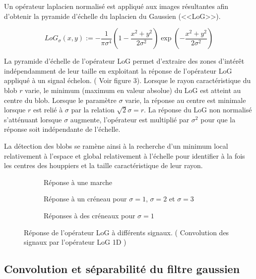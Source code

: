 \documentclass{article}
\begin{document}
	Un opérateur laplacien normalisé est appliqué aux images résultantes afin d'obtenir la pyramide d'échelle du laplacien du Gaussien (<<LoG>>). 

	\[{LoG}_{\sigma}(x,y):=-\frac{1}{\pi\sigma^{4}}(1-\frac{x^{2}+y^{2}}{2\sigma^{2}})\exp(-\frac{x^{2}+y^{2}}{2\sigma^{2}})\] 

	La pyramide d'échelle de l'opérateur LoG permet d'extraire des zones d'intérêt indépendamment de leur taille en exploitant la réponse de l'opérateur LoG appliqué à un signal échelon. ( Voir figure 3). Lorsque le rayon caractéristique du blob $r$ varie, le minimum (maximum en valeur absolue) du LoG est atteint au centre du blob. Lorsque le paramètre $\sigma$ varie, la réponse au centre est minimale lorsque $r$ est relié à $\sigma$ par la relation $\sqrt{2}\sigma=r$. La réponse du LoG non normalisé s'atténuant lorsque $\sigma$ augmente, l'opérateur est multiplié par $\sigma^{2}$ pour que la réponse soit indépendante de l'échelle.

	La détection des blobs se ramène ainsi à la recherche d'un minimum local relativement à l'espace et global relativement à l'échelle pour identifier à la fois les centres des houppiers et la taille caractéristique de leur rayon. 

	
\begin{figure}[h]
	\begin{subfigure}{.5\textwidth}
		\scalebox{0.3}{}
		\caption{Réponse à une marche}
	\end{subfigure}
	\begin{subfigure}{.5\textwidth}
		\scalebox{0.3}{}
		\caption{Réponse à un créneau pour $\sigma=1$, $\sigma=2$ et $\sigma=3$ }
	\end{subfigure}
	\begin{subfigure}{.5\textwidth}
		\scalebox{0.3}{}
		\caption{Réponses à des créneaux pour $\sigma=1$}
	\end{subfigure}
	\caption{Réponse de l'opérateur LoG à différents signaux. ( Convolution des signaux par l'opérateur LoG 1D )}
	\label{fig:graph}
\end{figure}

	\subsection{Convolution et séparabilité du filtre gaussien}
\end{document}
